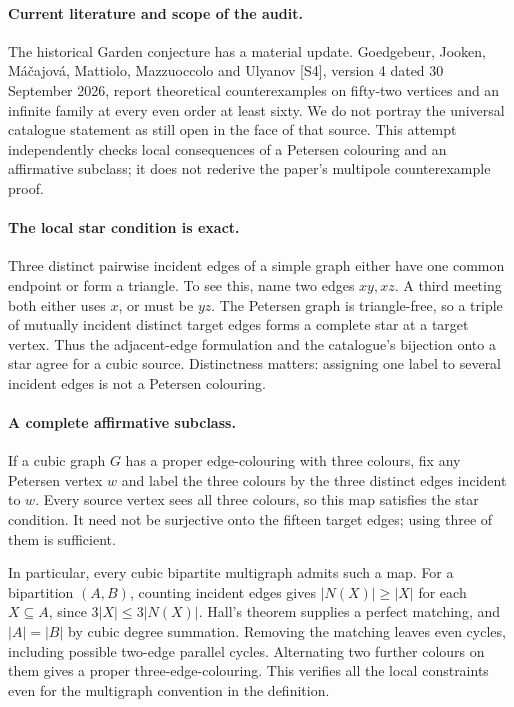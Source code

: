 \documentclass[11pt,a4paper]{article}
\begin{document}
\paragraph{Current literature and scope of the audit.}
The historical Garden conjecture has a material update. Goedgebeur, Jooken, M\'a\v cajov\'a, Mattiolo, Mazzuoccolo and Ulyanov [S4], version 4 dated 30 September 2026, report theoretical counterexamples on fifty-two vertices and an infinite family at every even order at least sixty. We do not portray the universal catalogue statement as still open in the face of that source. This attempt independently checks local consequences of a Petersen colouring and an affirmative subclass; it does not rederive the paper's multipole counterexample proof.

\paragraph{The local star condition is exact.}
Three distinct pairwise incident edges of a simple graph either have one common endpoint or form a triangle. To see this, name two edges $xy,xz$. A third meeting both either uses $x$, or must be $yz$. The Petersen graph is triangle-free, so a triple of mutually incident distinct target edges forms a complete star at a target vertex. Thus the adjacent-edge formulation and the catalogue's bijection onto a star agree for a cubic source. Distinctness matters: assigning one label to several incident edges is not a Petersen colouring.

\paragraph{A complete affirmative subclass.}
If a cubic graph $G$ has a proper edge-colouring with three colours, fix any Petersen vertex $w$ and label the three colours by the three distinct edges incident to $w$. Every source vertex sees all three colours, so this map satisfies the star condition. It need not be surjective onto the fifteen target edges; using three of them is sufficient.

In particular, every cubic bipartite multigraph admits such a map. For a bipartition $(A,B)$, counting incident edges gives $|N(X)|\ge|X|$ for each $X\subseteq A$, since $3|X|\le3|N(X)|$. Hall's theorem supplies a perfect matching, and $|A|=|B|$ by cubic degree summation. Removing the matching leaves even cycles, including possible two-edge parallel cycles. Alternating two further colours on them gives a proper three-edge-colouring. This verifies all the local constraints even for the multigraph convention in the definition.
\end{document}
